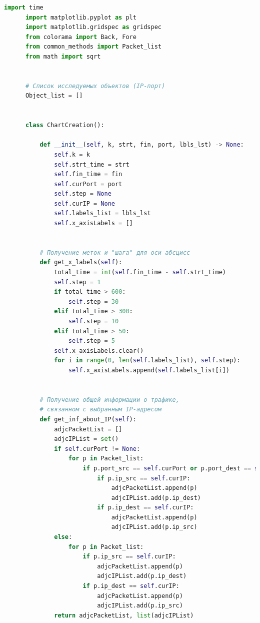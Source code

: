\documentclass[bachelor, och, coursework]{SCWorks}
\begin{document}
    \begin{lstlisting}[language=Python]
      import time
      import matplotlib.pyplot as plt
      import matplotlib.gridspec as gridspec
      from colorama import Back, Fore
      from common_methods import Packet_list
      from math import sqrt
      
      
      # Список исследуемых объектов (IP-порт)
      Object_list = []
      
      
      class ChartCreation():
      
          def __init__(self, k, strt, fin, port, lbls_lst) -> None:
              self.k = k
              self.strt_time = strt
              self.fin_time = fin
              self.curPort = port
              self.step = None
              self.curIP = None
              self.labels_list = lbls_lst
              self.x_axisLabels = []
      
      
          # Получение меток и "шага" для оси абсцисс
          def get_x_labels(self):
              total_time = int(self.fin_time - self.strt_time)
              self.step = 1
              if total_time > 600:
                  self.step = 30
              elif total_time > 300:
                  self.step = 10
              elif total_time > 50:
                  self.step = 5
              self.x_axisLabels.clear()
              for i in range(0, len(self.labels_list), self.step):
                  self.x_axisLabels.append(self.labels_list[i])
      
      
          # Получение общей информации о трафике,
          # связанном с выбранным IP-адресом
          def get_inf_about_IP(self):
              adjcPacketList = []
              adjcIPList = set()
              if self.curPort != None:
                  for p in Packet_list:
                      if p.port_src == self.curPort or p.port_dest == self.curPort:
                          if p.ip_src == self.curIP:
                              adjcPacketList.append(p)
                              adjcIPList.add(p.ip_dest)
                          if p.ip_dest == self.curIP:
                              adjcPacketList.append(p)
                              adjcIPList.add(p.ip_src)
              else:
                  for p in Packet_list:
                      if p.ip_src == self.curIP:
                          adjcPacketList.append(p)
                          adjcIPList.add(p.ip_dest)
                      if p.ip_dest == self.curIP:
                          adjcPacketList.append(p)
                          adjcIPList.add(p.ip_src)
              return adjcPacketList, list(adjcIPList)
      

\end{lstlisting}
\end{document}

